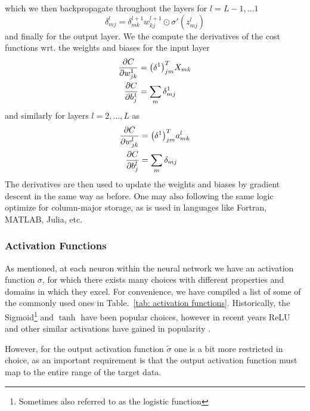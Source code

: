 \documentclass[reprint, english, nofootinbib]{revtex4-2}
\begin{document}
which we then backpropagate throughout the layers for $l = L-1, \dots 1$
\begin{equation}
    \delta^{l}_{mj} = \delta^{l+1}_{mk}w^{l+1}_{kj} \odot \sigma'(z^l_{mj})
\end{equation}
and finally for the output layer. We the compute the derivatives of the cost functions wrt. the weights and biases for the input layer
\begin{align}
    \begin{split}
        \pdv{C}{w^{1}_{jk}} &= \qty(\delta^1)^T_{jm} X_{mk} \\
        \pdv{C}{b^1_{j}} &= \sum_m \delta^1_{mj}
    \end{split}
\end{align}
and similarly for layers $l = 2, \dots, L$ as
\begin{align}
    \begin{split}
        \pdv{C}{w^{l}_{jk}} &= \qty(\delta^1)^T_{jm} a^l_{mk} \\
        \pdv{C}{b^l_{j}} &= \sum_m \delta_{mj}
    \end{split}
\end{align}
The derivatives are then used to update the weights and biases by gradient descent in the same way as before. One may also following the same logic optimize for column-major storage, as is used in languages like Fortran, MATLAB, Julia, etc.

\subsubsection{Activation Functions}
\noindent
As mentioned, at each neuron within the neural network we have an activation function $\sigma$, for which there exists many choices with different properties and domains in which they excel. For convenience, we have compiled a list of some of the commonly used ones in Table.~\ref{tab: activation functions}. Historically, the Sigmoid\footnote{Sometimes also referred to as the logistic function} and $\tanh$ have been popular choices, however in recent years ReLU and other similar activations have gained in popularity \cite{Aggarwall}.

However, for the output activation function $\tilde\sigma$ one is a bit more restricted in choice, as an important requirement is that the output activation function must map to the entire range of the target data.
\end{document}
